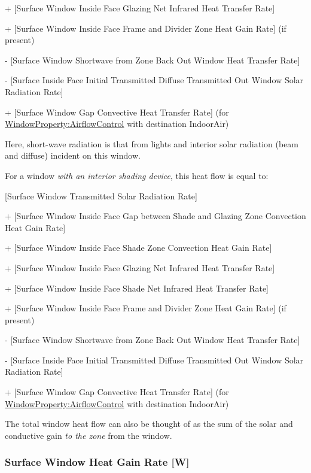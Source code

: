   + {[}Surface Window Inside Face Glazing Net Infrared Heat Transfer Rate{]}
  
  + {[}Surface Window Inside Face Frame and Divider Zone Heat Gain Rate{]} (if present)
  
  - {[}Surface Window Shortwave from Zone Back Out Window Heat Transfer Rate{]}
  
  - {[}Surface Inside Face Initial Transmitted Diffuse Transmitted Out Window Solar Radiation Rate{]}

  + {[Surface Window Gap Convective Heat Transfer Rate] (for \hyperref[windowpropertyairflowcontrol]{WindowProperty:AirflowControl} with destination IndoorAir)}

Here, short-wave radiation is that from lights and interior solar radiation (beam and diffuse) incident on this window.

For a window \emph{with an interior shading device}, this heat flow is equal to:

  {[}Surface Window Transmitted Solar Radiation Rate{]}

  + {[}Surface Window Inside Face Gap between Shade and Glazing Zone Convection Heat Gain Rate{]}

  + {[}Surface Window Inside Face Shade Zone Convection Heat Gain Rate{]}

  + {[}Surface Window Inside Face Glazing Net Infrared Heat Transfer Rate{]}

  + {[}Surface Window Inside Face Shade Net Infrared Heat Transfer Rate{]}

  + {[}Surface Window Inside Face Frame and Divider Zone Heat Gain Rate{]} (if present)

  - {[}Surface Window Shortwave from Zone Back Out Window Heat Transfer Rate{]}

  - {[}Surface Inside Face Initial Transmitted Diffuse Transmitted Out Window Solar Radiation Rate{]}
  
  + {[Surface Window Gap Convective Heat Transfer Rate] (for \hyperref[windowpropertyairflowcontrol]{WindowProperty:AirflowControl} with destination IndoorAir)}

The total window heat flow can also be thought of as the sum of the solar and conductive gain \emph{to the zone} from the window.

\subsubsection{Surface Window Heat Gain Rate {[}W{]}}\label{surface-window-heat-gain-rate-w}

